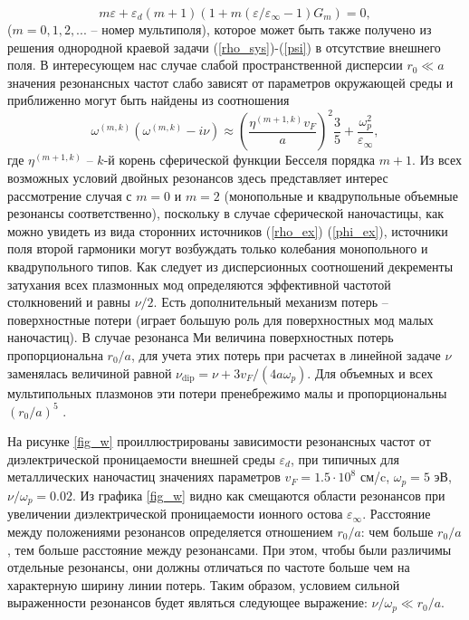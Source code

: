 \documentclass[12pt, a4paper]{article}
\def \eps {\varepsilon}
\def \w {\omega}
\newcommand{\op}[1]{\operatorname {#1}}
\begin{document}
\begin{equation} 	
m \eps + \eps_d(m+1)(1 + m (\eps/\eps_\infty - 1) G_m) = 0,	
\end{equation}
($m=0,1,2,...$ – номер мультиполя), которое может быть также получено из решения однородной краевой задачи (\ref{rho_sys})-(\ref{psi}) в отсутствие внешнего поля. В интересующем нас случае слабой пространственной дисперсии $r_0 \ll a$ значения резонансных частот слабо зависят от параметров окружающей среды и приближенно могут быть найдены из соотношения 
\begin{equation} 
 \w^{(m,k)}(\w^{(m,k)} - i \nu) \approx \left(\frac{\eta^{(m+1,k)} v_F }{a}\right)^2 \frac{3}{5} + \frac{\w_p^2}{\eps_\infty},
\end{equation}
где $\eta^{(m+1,k)}$ -- $k$-й корень сферической функции Бесселя порядка $m+1$.	Из всех возможных условий двойных резонансов здесь представляет интерес рассмотрение случая с $m=0$ и $m=2$ (монопольные и квадрупольные объемные резонансы соответственно), поскольку в случае сферической наночастицы, как можно увидеть из вида сторонних источников (\ref{rho_ex}) (\ref{phi_ex}), источники поля второй гармоники могут возбуждать только колебания монопольного и квадрупольного типов. 
Как следует из дисперсионных соотношений декременты затухания всех плазмонных мод определяются эффективной частотой столкновений и равны $\nu/2$. 
Есть дополнительный механизм потерь -- поверхностные потери (играет большую роль для поверхностных мод малых наночастиц).
В случае резонанса Ми величина поверхностных потерь пропорциональна  $r_0/a$, для учета этих потерь при расчетах в линейной задаче  $\nu$ заменялась величиной равной $\nu_{\op{dip}} = \nu + 3 v_F / (4a  \w_p)$.
Для объемных и всех мультипольных плазмонов эти потери пренебрежимо малы и пропорциональны $(r_0/a)^5$ \cite{Hovel1993}.



На рисунке \ref{fig_w} проиллюстрированы зависимости резонансных частот от диэлектрической проницаемости внешней среды $\eps_d$, при типичных для металлических наночастиц значениях параметров $v_F = 1.5 \cdot 10^8$ см/c, $\w_p = 5$ эВ, $\nu / \w_p = 0.02$. Из графика \ref{fig_w} видно как смещаются области резонансов при увеличении диэлектрической проницаемости ионного остова $\eps_\infty$. Расстояние между положениями резонансов определяется отношением $r_0/a$: чем больше $r_0/a$, тем больше расстояние между резонансами. При этом, чтобы были различимы отдельные резонансы, они должны отличаться по частоте больше чем на характерную ширину линии потерь. Таким образом, условием сильной выраженности резонансов будет являться следующее выражение: $\nu/\w_p \ll r_0/a$.
\end{document}
